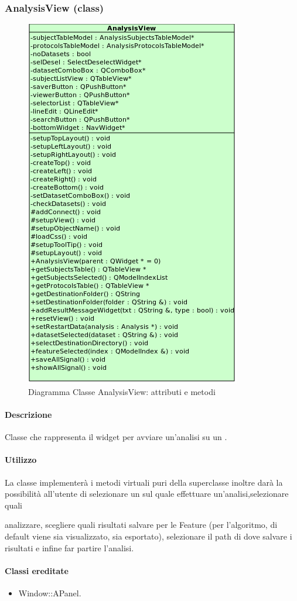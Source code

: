 \subsubsection{AnalysisView (class)}
\label{speanaV}
\begin{figure}[!h]
\centering
			\includegraphics[width=0.5\linewidth]{./Content/Immagini/view/AnalysisView.png}
			\caption{Diagramma Classe AnalysisView: attributi e metodi}
			\label{cl_anaview}
\end{figure}
\paragraph{Descrizione \\}
Classe che rappresenta il widget per avviare un'analisi su un \dataset{}.
\paragraph{Utilizzo\\}
La classe implementerà i metodi virtuali puri della superclasse inoltre darà la possibilità all'utente di selezionare un \dataset{} sul quale effettuare un'analisi,selezionare quali \subject{} analizzare, scegliere quali risultati salvare per le Feature\g{} (per l'algoritmo, di default viene sia visualizzato, sia esportato), selezionare il path di dove salvare i risultati e infine far partire l'analisi.
\paragraph{Classi ereditate\\}
\begin{itemize}
\item Window::APanel.
\end{itemize}

